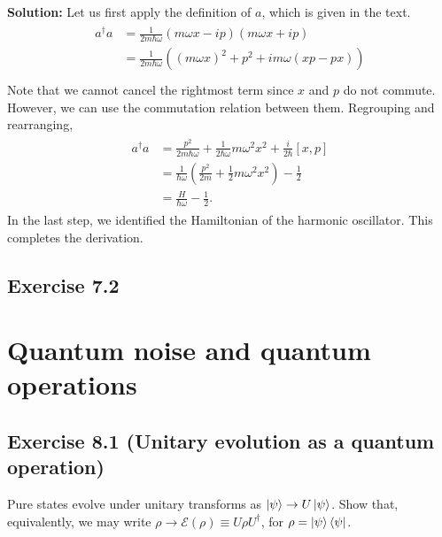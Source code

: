 \documentclass{book}
\newcommand{\mc}[1]{\mathcal{#1}}
\begin{document}
    \textbf{Solution:} Let us first apply the definition of $a$, which is given in the text.
    \begin{align}
    \begin{aligned}
        a^\dagger a &= \frac{1}{2m\hbar\omega}(m\omega x-ip)(m\omega x+ip) \\
        &= \frac{1}{2m\hbar\omega} \left((m\omega x)^2 + p^2 + im\omega(xp-px)\right) \\
    \end{aligned}
    \end{align}
    Note that we cannot cancel the rightmost term since $x$ and $p$ do not commute. However, we can use the commutation relation between them. Regrouping and rearranging,
    \begin{align}
    \begin{aligned}
        a^\dagger a &= \frac{p^2}{2m\hbar\omega}+\frac{1}{2\hbar\omega}m \omega^2 x^2 + \frac{i}{2\hbar} [x,p] \\
        &= \frac{1}{\hbar\omega} \left(\frac{p^2}{2m} + \frac{1}{2}m\omega^2 x^2\right) - \frac{1}{2} \\
        &= \frac{H}{\hbar\omega}-\frac{1}{2}.
    \end{aligned}
    \end{align}
    In the last step, we identified the Hamiltonian of the harmonic oscillator. This completes the derivation.
    
\section*{Exercise 7.2}

\chapter{Quantum noise and quantum operations}

\section*{Exercise 8.1 (Unitary evolution as a quantum operation)}
    Pure states evolve under unitary transforms as $\ket{\psi}\rightarrow U\ket{\psi}$. Show that, equivalently, we may write $\rho \rightarrow \mc{E}(\rho) \equiv U \rho U^\dagger$, for $\rho = \ket{\psi}\bra{\psi}$.
    
\end{document}
